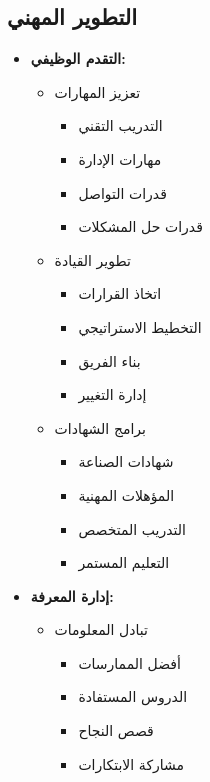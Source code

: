 \subsection{التطوير المهني}
\begin{itemize}
    \item \textbf{التقدم الوظيفي:}
    \begin{itemize}
        \item تعزيز المهارات
        \begin{itemize}
            \item التدريب التقني
            \item مهارات الإدارة
            \item قدرات التواصل
            \item قدرات حل المشكلات
        \end{itemize}
        
        \item تطوير القيادة
        \begin{itemize}
            \item اتخاذ القرارات
            \item التخطيط الاستراتيجي
            \item بناء الفريق
            \item إدارة التغيير
        \end{itemize}
        
        \item برامج الشهادات
        \begin{itemize}
            \item شهادات الصناعة
            \item المؤهلات المهنية
            \item التدريب المتخصص
            \item التعليم المستمر
        \end{itemize}
    \end{itemize}
    
    \item \textbf{إدارة المعرفة:}
    \begin{itemize}
        \item تبادل المعلومات
        \begin{itemize}
            \item أفضل الممارسات
            \item الدروس المستفادة
            \item قصص النجاح
            \item مشاركة الابتكارات
        \end{itemize}
        

\end{itemize}
\end{itemize}
